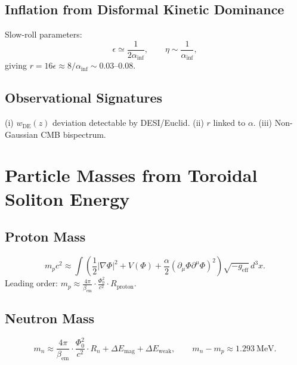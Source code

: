 \documentclass[12pt, a4paper]{article}
\begin{document}
\subsection{Inflation from Disformal Kinetic Dominance}
Slow-roll parameters:
\begin{equation}
\epsilon \simeq \frac{1}{2\alpha_{\mathrm{inf}}}, \qquad \eta \sim \frac{1}{\alpha_{\mathrm{inf}}},
\label{eq:slowroll}
\end{equation}
giving $r = 16\epsilon \approx 8/\alpha_{\mathrm{inf}} \sim 0.03$--$0.08$.

\subsection{Observational Signatures}
(i) $w_{\mathrm{DE}}(z)$ deviation detectable by DESI/Euclid. (ii) $r$ linked to $\alpha$. (iii) Non-Gaussian CMB bispectrum.

\section{Particle Masses from Toroidal Soliton Energy}
\label{sec:masses}

\subsection{Proton Mass}
\begin{equation}
m_p c^2 \approx \int \left( \frac{1}{2} |\nabla \Phi|^2 + V(\Phi) + \frac{\alpha}{2} (\partial_\mu \Phi \partial^\mu \Phi)^2 \right) \sqrt{-g_{\mathrm{eff}}} \, d^3x.
\label{eq:proton_mass}
\end{equation}
Leading order: $m_p \approx \frac{4\pi}{\beta_{\mathrm{em}}} \cdot \frac{\Phi_0^2}{c^2} \cdot R_{\mathrm{proton}}$.

\subsection{Neutron Mass}
\begin{equation}
m_n \approx \frac{4\pi}{\beta_{\mathrm{em}}} \cdot \frac{\Phi_0^2}{c^2} \cdot R_n + \Delta E_{\mathrm{mag}} + \Delta E_{\mathrm{weak}}, \qquad m_n - m_p \approx 1.293\ \mathrm{MeV}.
\label{eq:neutron_mass}
\end{equation}
\end{document}
